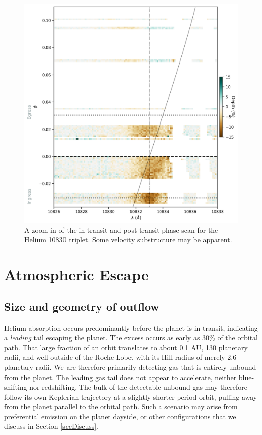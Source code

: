 \documentclass[twocolumn]{aastex631}
\begin{document}
\begin{figure}
    \includegraphics[width=\linewidth]{figures/phase_2D_diagram_zoom.png}
    \caption{A zoom-in of the in-transit and post-transit phase scan for the Helium 10830 triplet.  Some velocity substructure may be apparent.}
    \label{fig:HeliumScanZoom}
\end{figure}


\section{Atmospheric Escape}

\subsection{Size and geometry of outflow}
Helium absorption occurs predominantly before the planet is in-transit, indicating a \emph{leading} tail escaping the planet.  The excess occurs as early as 30\% of the orbital path.  That large fraction of an orbit translates to about 0.1 AU, 130 planetary radii, and well outside of the Roche Lobe, with its Hill radius of merely 2.6 planetary radii.  We are therefore primarily detecting gas that is entirely unbound from the planet.  The leading gas tail does not appear to accelerate, neither blue-shifting nor redshifting.   The bulk of the detectable unbound gas may therefore follow its own Keplerian trajectory at a slightly shorter period orbit, pulling away from the planet parallel to the orbital path.  Such a scenario may arise from preferential emission on the planet dayside, or other configurations that we discuss in Section \ref{secDiscuss}.
\end{document}
